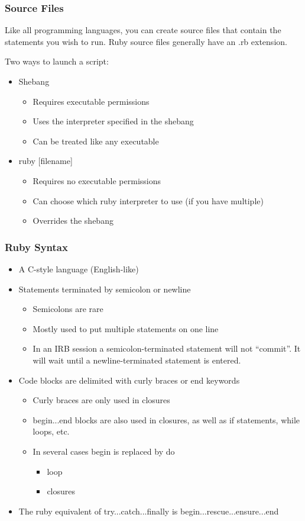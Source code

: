 \documentclass[helvetica,english,utf8,notitle,nologo]{beamer}
\begin{document}
\begin{frame}
  \frametitle{Source Files}

  Like all programming languages, you can create source files that
  contain the statements you wish to run. Ruby source files generally
  have an .rb extension.

  Two ways to launch a script:
  \begin{itemize}
  \item Shebang
    \begin{itemize}
    \item Requires executable permissions
    \item Uses the interpreter specified in the shebang
    \item Can be treated like any executable
    \end{itemize}
  \item ruby [filename]
    \begin{itemize}
    \item Requires no executable permissions
    \item Can choose which ruby interpreter to use (if you have
      multiple)
    \item Overrides the shebang
    \end{itemize}
  \end{itemize}
\end{frame}

\begin{frame}
  \frametitle{Ruby Syntax}
  \begin{itemize}
  \item A C-style language (English-like)
  \item Statements terminated by semicolon or newline
    \begin{itemize}
    \item Semicolons are rare
    \item Mostly used to put multiple statements on one line
    \item In an IRB session a semicolon-terminated statement will not
      ``commit''. It will wait until a newline-terminated statement is
      entered.
    \end{itemize}
  \item Code blocks are delimited with curly braces or end
    keywords
     \begin{itemize}
     \item Curly braces are only used in closures
     \item begin...end blocks are also used in closures, as well as if
       statements, while loops, etc.
     \item In several cases begin is replaced by do
       \begin{itemize}
       \item loop
       \item closures
       \end{itemize}
     \end{itemize}
     \item The ruby equivalent of try...catch...finally is
       begin...rescue...ensure...end
  \end{itemize}
\end{frame}
\end{document}
